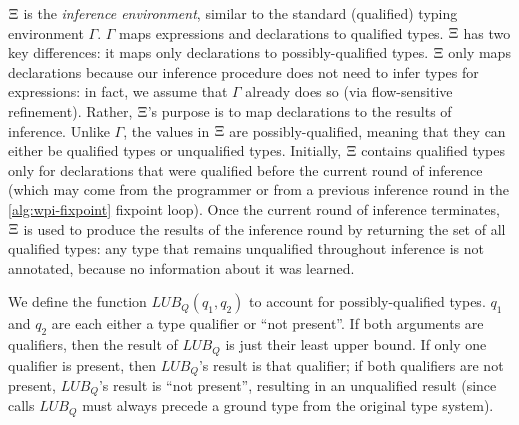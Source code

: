 $\Xi$ is the \emph{inference environment}, similar to the standard (qualified)
typing environment $\Gamma$. $\Gamma$ maps expressions and declarations to qualified types.
$\Xi$ has two key differences: it maps only declarations to possibly-qualified types.
$\Xi$ only maps declarations because our inference procedure does not need to infer
types for expressions: in fact, we assume that $\Gamma$ already does so (via flow-sensitive
refinement). Rather, $\Xi$'s purpose is to map declarations to the results of inference.
Unlike $\Gamma$, the values in $\Xi$ are possibly-qualified, meaning that they can either
be qualified types or unqualified types. Initially, $\Xi$ contains qualified types only
for declarations that were qualified before the current round of inference (which may come from
the programmer or from a previous inference round in the \cref{alg:wpi-fixpoint} fixpoint loop).
Once the current round of inference terminates, $\Xi$ is used to produce the results of the
inference round by returning the set of all qualified types: any type that remains unqualified
throughout inference is not annotated, because no information about it was learned.

We define the function $\mathit{LUB_Q}(q_1, q_2)$ to account for possibly-qualified types.
$q_1$ and $q_2$ are each either a type qualifier or ``not present''.
If both arguments are qualifiers, then the result of $\mathit{LUB_Q}$
is just their least upper bound. If only one qualifier is present, then $\mathit{LUB_Q}$'s result
is that qualifier; if both qualifiers are not present, $\mathit{LUB_Q}$'s result is ``not present'',
resulting in an unqualified result (since calls $\mathit{LUB_Q}$ must always precede a ground type
from the original type system).



